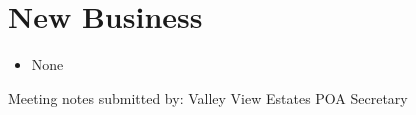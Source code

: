 \documentclass[12pt,a4paper]{article}
\begin{document}
\section*{New Business}
\begin{itemize}
  \item None
\end{itemize}

\begin{flushleft}
Meeting notes submitted by:\break{}
\@author\break{}
Valley View Estates POA Secretary
\end{flushleft}
\end{document}
